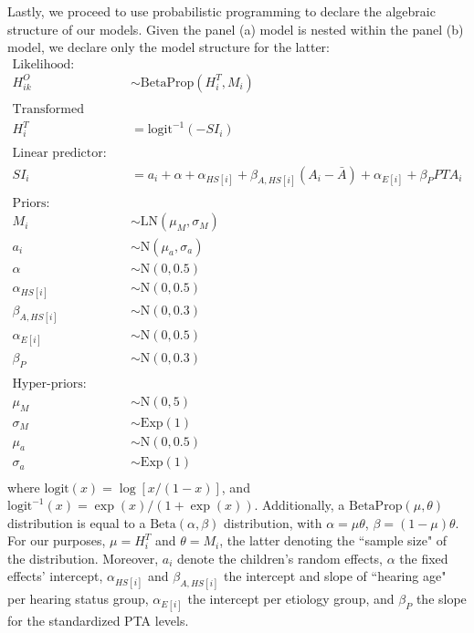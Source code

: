 Lastly, we proceed to use probabilistic programming to declare the algebraic structure of our models. Given the panel (a) model is nested within the panel (b) model, we declare only the model structure for the latter:
%
\begin{align}
	\text{Likelihood:} & \nonumber \\
	H^{O}_{ik} & \sim \text{BetaProp} \left( H^{T}_{i}, M_{i} \right) \\ 
	\nonumber \\
	\text{Transformed parameters:} & \nonumber \\
	H^{T}_{i} &= \text{logit}^{-1}( -SI_{i} ) \\
	\nonumber \\
	\text{Linear predictor:} & \nonumber \\
	SI_{i} & = a_{i} + \alpha + \alpha_{HS[i]} + \beta_{A, HS[i]} (A_{i} - \bar{A}) + \alpha_{E[i]} + \beta_{P} PTA_{i} \\ 
	\nonumber \\
	\text{Priors:} & \nonumber \\
	M_{i} & \sim \text{LN}( \mu_{M}, \sigma_{M}) \\
	a_{i} & \sim \text{N}(\mu_{a}, \sigma_{a}) \\
	\alpha & \sim \text{N}(0, 0.5) \\
	\alpha_{HS[i]} & \sim \text{N}(0, 0.5) \\
	\beta_{A, HS[i]} & \sim \text{N}(0 , 0.3) \\
	\alpha_{E[i]} & \sim \text{N}(0, 0.5) \\
	\beta_{P} & \sim \text{N}(0, 0.3) \\
	\nonumber \\
	\text{Hyper-priors:} & \nonumber \\
	\mu_{M} & \sim \text{N}(0, 5) \\
	\sigma_{M} & \sim \text{Exp}(1) \\
	\mu_{a} & \sim \text{N}(0, 0.5) \\
	\sigma_{a} & \sim \text{Exp}(1)\\
\end{align}
%
where $\text{logit}(x) = \log \left[ x / ( 1 - x ) \right]$, and $\text{logit}^{-1}(x) = \exp(x) / ( 1 + \exp(x) ) $. Additionally, a $\text{BetaProp}(\mu, \theta)$ distribution is equal to a $\text{Beta}(\alpha, \beta)$ distribution, with $\alpha=\mu \theta$, $\beta=(1-\mu)\theta$. For our purposes, $\mu = H^{T}_{i}$ and $\theta = M_{i}$, the latter denoting the ``sample size" of the distribution. Moreover, $a_{i}$ denote the children's random effects, $\alpha$ the fixed effects' intercept, $\alpha_{HS[i]}$ and $\beta_{A, HS[i]}$ the intercept and slope of ``hearing age" per hearing status group, $\alpha_{E[i]}$ the intercept per etiology group, and $\beta_{P}$ the slope for the standardized PTA levels. 

